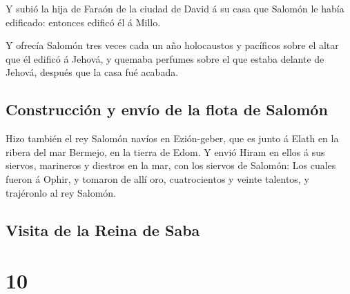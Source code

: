  Y subió la hija de Faraón de la ciudad de David á su
casa que Salomón le había edificado: entonces edificó él á Millo.

 Y ofrecía Salomón tres veces cada un año holocaustos y
pacíficos sobre el altar que él edificó á Jehová, y quemaba perfumes
sobre el que estaba delante de Jehová, después que la casa fué acabada.

\hypertarget{construcciuxf3n-y-envuxedo-de-la-flota-de-salomuxf3n}{%
\subsection{Construcción y envío de la flota de
Salomón}\label{construcciuxf3n-y-envuxedo-de-la-flota-de-salomuxf3n}}

 Hizo también el rey Salomón navíos en Ezión-geber, que
es junto á Elath en la ribera del mar Bermejo, en la tierra de Edom.
 Y envió Hiram en ellos á sus siervos, marineros y
diestros en la mar, con los siervos de Salomón:  Los
cuales fueron á Ophir, y tomaron de allí oro, cuatrocientos y veinte
talentos, y trajéronlo al rey Salomón.

\hypertarget{visita-de-la-reina-de-saba}{%
\subsection{Visita de la Reina de
Saba}\label{visita-de-la-reina-de-saba}}

\hypertarget{section-11-10}{%
\section{10}\label{section-11-10}}

